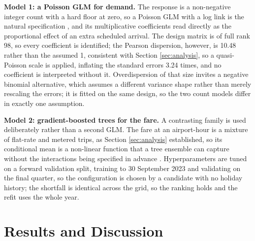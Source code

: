 \documentclass[11pt]{article}
\begin{document}
\textbf{Model 1: a Poisson GLM for demand.} The response is a non-negative
integer count with a hard floor at zero, so a Poisson GLM with a log link is the
natural specification \cite{mccullagh}, and its multiplicative coefficients read
directly as the proportional effect of an extra scheduled arrival. The design
matrix is of full rank 98, so every coefficient is identified; the Pearson
dispersion, however, is 10.48 rather than the assumed 1, consistent with Section
\ref{sec:analysis}, so a quasi-Poisson scale \cite{wedderburn} is applied,
inflating the standard errors 3.24 times, and no coefficient is interpreted
without it. Overdispersion of that size invites a negative binomial alternative,
which assumes a different variance shape rather than merely rescaling the errors;
it is fitted on the same design, so the two count models differ in exactly one
assumption.
 
\textbf{Model 2: gradient-boosted trees for the fare.} A contrasting family is
used deliberately rather than a second GLM. The fare at an airport-hour is a
mixture of flat-rate and metered trips, as Section \ref{sec:analysis}
established, so its conditional mean is a non-linear function that a tree
ensemble can capture without the interactions being specified in advance
\cite{friedman, sklearn}. Hyperparameters are tuned on a forward validation
split, training to 30 September 2023 and validating on the final quarter, so the
configuration is chosen by a candidate with no holiday history; the shortfall is
identical across the grid, so the ranking holds and the refit uses the whole year.
 
\section{Results and Discussion}
\label{sec:results}
 
\end{document}
